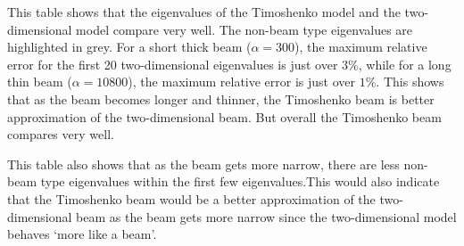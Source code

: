 \documentclass[../../main.tex]{subfiles}
\begin{document}
This table shows that the eigenvalues of the Timoshenko model and the two-dimensional model compare very well. The non-beam type eigenvalues are highlighted in grey. For a short thick beam ($\alpha = 300$), the maximum relative error for the first 20 two-dimensional eigenvalues is just over $3\%$, while for a long thin beam ($\alpha = 10800$), the maximum relative error is just over $1\%$. This shows that as the beam becomes longer and thinner, the Timoshenko beam is better approximation of the two-dimensional beam. But overall the Timoshenko beam compares very well.

This table also shows that as the beam gets more narrow, there are less non-beam type eigenvalues within the first few eigenvalues.This would also indicate that the Timoshenko beam would be a better approximation of the two-dimensional beam as the beam gets more narrow since the two-dimensional model behaves `more like a beam'.
\end{document}
